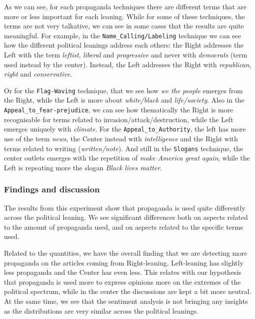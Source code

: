 As we can see, for each propaganda techniques there are different terms that are more or less important for each leaning. While for some of these techniques, the terms are not very talkative, we can see in some cases that the results are quite meaningful.
For example, in the \texttt{Name\_Calling/Labeling} technique we can see how the different political leanings address each others: the Right addresses the Left with the term \emph{leftist}, \emph{liberal} and \emph{progressive} and never with \emph{democrats} (term used instead by the center). Instead, the Left addresses the Right with \emph{republican}, \emph{right} and \emph{conservative}.

Or for the \texttt{Flag-Waving} technique, that we see how \emph{we the people} emerges from the Right, while the Left is more about \emph{white/black} and \emph{life/society}.
Also in the \texttt{Appeal\_to\_fear-prejudice}, we can see how thematically the Right is more recognisable for terms related to invasion/attack/destruction, while the Left emerges uniquely with \emph{climate}.
For the \texttt{Appeal\_to\_Authority}, the left has more use of the term \emph{news}, the Center instead with \emph{intelligence} and the Right with terms related to writing (\emph{written/note}).
And still in the \texttt{Slogans} technique, the center outlets emerges with the repetition of \emph{make America great again}, while the Left is repeating more the slogan \emph{Black lives matter}.

\subsubsection{Findings and discussion}

The results from this experiment show that propaganda is used quite differently across the political leaning.
We see significant differences both on aspects related to the amount of propaganda used, and on aspects related to the specific terms used.

Related to the quantities, we have the overall finding that we are detecting more propaganda on the articles coming from Right-leaning.
Left-leaning has slightly less propaganda and the Center has even less.
This relates with our hypothesis that propaganda is used more to express opinions more on the extremes of the political spectrum, while in the center the discussions are kept a bit more neutral.
At the same time, we see that the sentiment analysis is not bringing any insights as the distributions are very similar across the political leanings.

